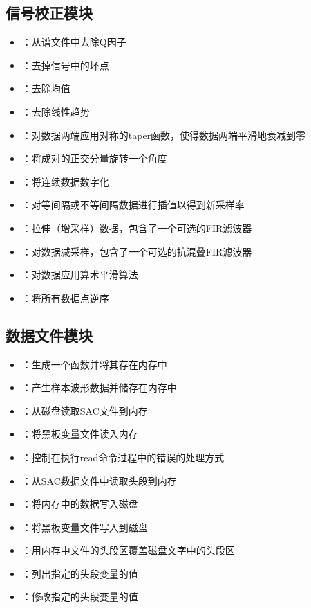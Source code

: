 \subsection*{信号校正模块}
\begin{itemize}
\item {}：从谱文件中去除Q因子
\item {}：去掉信号中的坏点
\item {}：去除均值
\item {}：去除线性趋势
\item {}：对数据两端应用对称的taper函数，使得数据两端平滑地衰减到零
\item {}：将成对的正交分量旋转一个角度
\item {}：将连续数据数字化
\item {}：对等间隔或不等间隔数据进行插值以得到新采样率
\item {}：拉伸（增采样）数据，包含了一个可选的FIR滤波器
\item {}：对数据减采样，包含了一个可选的抗混叠FIR滤波器
\item {}：对数据应用算术平滑算法
\item {}：将所有数据点逆序
\end{itemize}

\subsection*{数据文件模块}
\begin{itemize}
\item {}：生成一个函数并将其存在内存中
\item {}：产生样本波形数据并储存在内存中
\item {}：从磁盘读取SAC文件到内存
\item {}：将黑板变量文件读入内存
\item {}：控制在执行read命令过程中的错误的处理方式
\item {}：从SAC数据文件中读取头段到内存
\item {}：将内存中的数据写入磁盘
\item {}：将黑板变量文件写入到磁盘
\item {}：用内存中文件的头段区覆盖磁盘文字中的头段区
\item {}：列出指定的头段变量的值
\item {}：修改指定的头段变量的值
\end{itemize}

